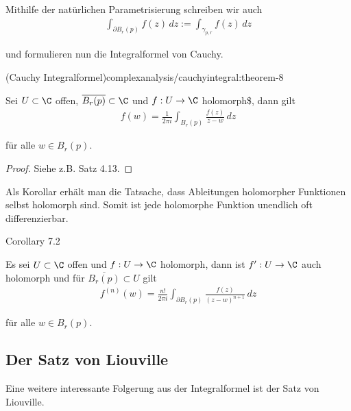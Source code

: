 \documentclass[letterpaper,10pt,german]{jupyterBook}
\begin{document}
\par
Mithilfe der natürlichen Parametrisierung schreiben wir auch
\begin{align*}
\int_{\partial B_r(p)} f(z)\, dz := \int_{\gamma_{p,r}} f(z)\, dz
\end{align*}
\par
und formulieren nun die Integralformel von Cauchy.
\begin{theorem}{(Cauchy Integralformel)}{complexanalysis/cauchyintegral:theorem-8}



\par
Sei \(U \subset \C\) offen, \(\overline{B_r(p)}\subset \C\) und \(f:U\to \C\) holomorph\$, dann gilt
\begin{align*}
f(w) = \frac{1}{2\pi i} \int_{B_r(p)} \frac{f(z)}{z-w}\, dz
\end{align*}
\par
für alle \(w\in B_r(p)\).
\end{theorem}

\begin{proof}
 Siehe z.B. \cite{Nee17} Satz 4.13.
\end{proof}

\par
Als Korollar erhält man die Tatsache, dass Ableitungen holomorpher Funktionen selbst holomorph sind. Somit ist jede holomorphe Funktion unendlich oft differenzierbar.
\label{complexanalysis/cauchyintegral:cor:infholo}
\begin{emphBox}{}{}{Corollary 7.2}



\par
Es sei \(U\subset\C\) offen und \(f:U\to\C\) holomorph, dann ist \(f^\prime:U\to\C\) auch holomorph und für \(\overline{B_r(p)}\subset U\) gilt
\begin{align*}
f^{(n)}(w) = \frac{n!}{2\pi i} \int_{\partial B_r(p)} \frac{f(z)}{(z-w)^{n+1}}\, dz
\end{align*}
\par
für alle \(w\in B_r(p)\).
\end{emphBox}


\subsection{Der Satz von Liouville}
\label{\detokenize{complexanalysis/cauchyintegral:der-satz-von-liouville}}
\par
Eine weitere interessante Folgerung aus der Integralformel ist der Satz von Liouville.
\end{document}
